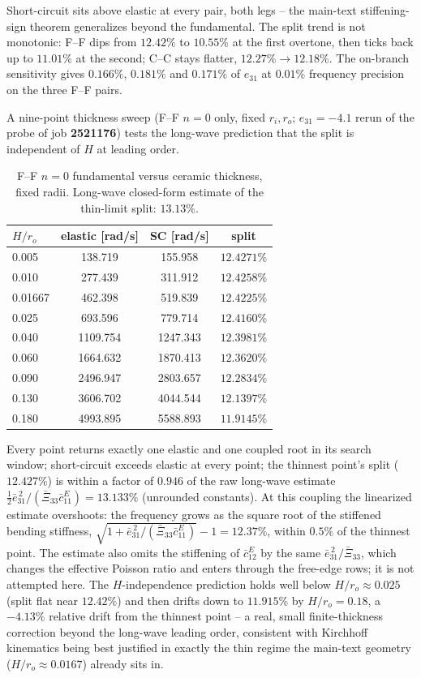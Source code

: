 \documentclass[11pt]{article}
\newcommand{\eebar}{\bar{e}_{31}}
\newcommand{\Xibar}{\bar{\Xi}_{33}}
\newcommand{\cbar}{\bar{c}_{11}^{E}}
\begin{document}
Short-circuit sits above elastic at every pair, both legs -- the
main-text stiffening-sign theorem generalizes beyond the fundamental.
The split trend is not monotonic: F--F dips from $12.42\%$ to $10.55\%$
at the first overtone, then ticks back up to $11.01\%$ at the second;
C--C stays flatter, $12.27\%\to12.18\%$. The on-branch sensitivity gives
$0.166\%$, $0.181\%$ and $0.171\%$ of $e_{31}$ at $0.01\%$ frequency
precision on the three F--F pairs.

A nine-point thickness sweep (F--F $n=0$ only, fixed $r_i,r_o$;
$e_{31}=-4.1$ rerun of the probe of job \textbf{2521176}) tests the
long-wave prediction that the split is independent of $H$ at leading
order.

\begin{table}[ht]
\centering
\caption{F--F $n=0$ fundamental versus ceramic thickness, fixed radii.
Long-wave closed-form estimate of the thin-limit split: $13.13\%$.}
\label{tab:thickness}
\small
\begin{tabular}{@{}lccc@{}}
\toprule
$H/r_o$ & elastic [rad/s] & SC [rad/s] & split \\
\midrule
0.005 & 138.719 & 155.958 & $12.4271\%$ \\
0.010 & 277.439 & 311.912 & $12.4258\%$ \\
0.01667 & 462.398 & 519.839 & $12.4225\%$ \\
0.025 & 693.596 & 779.714 & $12.4160\%$ \\
0.040 & 1109.754 & 1247.343 & $12.3981\%$ \\
0.060 & 1664.632 & 1870.413 & $12.3620\%$ \\
0.090 & 2496.947 & 2803.657 & $12.2834\%$ \\
0.130 & 3606.702 & 4044.544 & $12.1397\%$ \\
0.180 & 4993.895 & 5588.893 & $11.9145\%$ \\
\bottomrule
\end{tabular}
\end{table}

Every point returns exactly one elastic and one coupled root in its
search window; short-circuit exceeds elastic at every point; the
thinnest point's split ($12.427\%$) is within a factor of $0.946$ of the
raw long-wave estimate $\tfrac12\eebar^{\,2}/(\Xibar\cbar)=13.133\%$
(unrounded constants). At this coupling the linearized estimate
overshoots: the frequency grows as the square root of the stiffened
bending stiffness, $\sqrt{1+\eebar^{\,2}/(\Xibar\cbar)}-1=12.37\%$,
within $0.5\%$ of the thinnest point. The estimate also omits the
stiffening of $\bar c_{12}^E$ by the same $\eebar^{\,2}/\Xibar$, which
changes the effective Poisson ratio and enters through the free-edge
rows; it is not attempted here. The
$H$-independence prediction holds well below $H/r_o\approx0.025$
(split flat near $12.42\%$) and then drifts down to $11.915\%$ by
$H/r_o=0.18$, a $-4.13\%$ relative drift from the thinnest point -- a
real, small finite-thickness correction beyond the long-wave leading
order, consistent with Kirchhoff kinematics being best justified in
exactly the thin regime the main-text geometry ($H/r_o\approx0.0167$)
already sits in.
\end{document}
